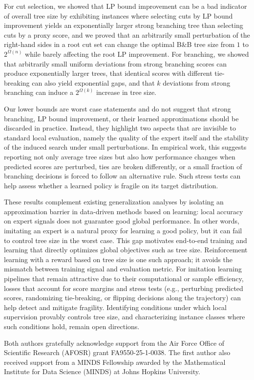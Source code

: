 \documentclass[smallextended,envcountsect]{svjour3} %
\newcommand{\0}{\mathbf{0}}
\newcommand{\1}{\mathbf{1}} %
\begin{document}
For cut selection, we showed that LP bound improvement can be a bad indicator of overall tree size by exhibiting instances where selecting cuts by LP bound improvement yields an exponentially larger strong branching tree than selecting cuts by a proxy score, and we proved that an arbitrarily small perturbation of the right-hand sides in a root cut set can change the optimal B\&B tree size from $1$ to $2^{\Omega(n)}$ while barely affecting the root LP improvement.
For branching, we showed that arbitrarily small uniform deviations from strong branching scores can produce exponentially larger trees, that identical scores with different tie-breaking can also yield exponential gaps, and that $k$ deviations from strong branching can induce a $2^{\Omega(k)}$ increase in tree size.

Our lower bounds are worst case statements and do not suggest that strong branching, LP bound improvement, or their learned approximations should be discarded in practice.
Instead, they highlight two aspects that are invisible to standard local evaluation, namely the quality of the expert itself and the stability of the induced search under small perturbations.
In empirical work, this suggests reporting not only average tree sizes but also how performance changes when predicted scores are perturbed, ties are broken differently, or a small fraction of branching decisions is forced to follow an alternative rule.
Such stress tests can help assess whether a learned policy is fragile on its target distribution.

These results complement existing generalization analyses by isolating an approximation barrier in data-driven methods based on learning: local accuracy on expert signals does not guarantee good global performance.
In other words, imitating an expert is a natural proxy for learning a good policy, but it can fail to control tree size in the worst case.
This gap motivates end-to-end training and learning that directly optimizes global objectives such as tree size.
Reinforcement learning with a reward based on tree size is one such approach; it avoids the mismatch between training signal and evaluation metric.
For imitation learning pipelines that remain attractive due to their computational or sample efficiency, losses that account for score margins and stress tests (e.g., perturbing predicted scores, randomizing tie-breaking, or flipping decisions along the trajectory) can help detect and mitigate fragility.
Identifying conditions under which local supervision provably controls tree size, and characterizing instance classes where such conditions hold, remain open directions.

\renewcommand{\ackname}{Acknowledgments and Disclosure of Funding}
\begin{acknowledgements}
Both authors gratefully acknowledge support from the Air Force Office of Scientific Research (AFOSR) grant FA9550-25-1-0038. The first author also received support from a MINDS Fellowship awarded by the Mathematical Institute for Data Science (MINDS) at Johns Hopkins University.
\end{acknowledgements}
\nocite{}
\clearpage


\end{document}
